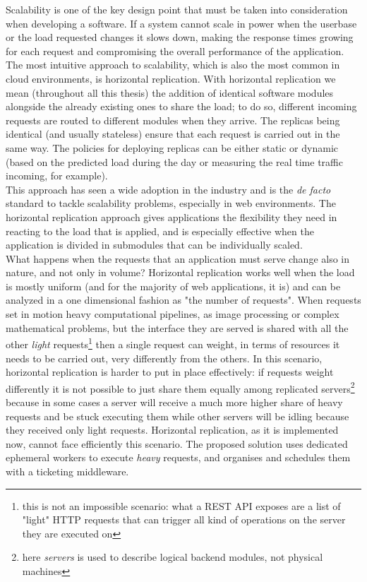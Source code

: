 Scalability is one of the key design point that must be taken into consideration when developing a software. If a system cannot scale in power when the userbase or the load requested changes it slows down, making the response times growing for each request and compromising the overall performance of the application. The most intuitive approach to scalability, which is also the most common in cloud environments, is horizontal replication. With horizontal replication we mean (throughout all this thesis) the addition of identical software modules alongside the already existing ones to share the load; to do so, different incoming requests are routed to different modules when they arrive. The replicas being identical (and usually stateless) ensure that each request is carried out in the same way. The policies for deploying replicas can be either static or dynamic (based on the predicted load during the day or measuring the real time traffic incoming, for example).\\

This approach has seen a wide adoption in the industry and is the \textit{de facto} standard to tackle scalability problems, especially in web environments. The horizontal replication approach gives applications the flexibility they need in reacting to the load that is applied, and is especially effective when the application is divided in submodules that can be individually scaled.\\

What happens when the requests that an application must serve change also in nature, and not only in volume? Horizontal replication works well when the load is mostly uniform (and for the majority of web applications, it is) and can be analyzed in a one dimensional fashion as "the number of requests". When requests set in motion heavy computational pipelines, as image processing or complex mathematical problems, but the interface they are served is shared with all the other \textit{light} requests\footnote{this is not an impossible scenario: what a REST API exposes are a list of "light" HTTP requests that can trigger all kind of operations on the server they are executed on} then a single request can weight, in terms of resources it needs to be carried out, very differently from the others. In this scenario, horizontal replication is harder to put in place effectively: if requests weight differently it is not possible to just share them equally among replicated servers\footnote{here \textit{servers} is used to describe logical backend modules, not physical machines} because in some cases a server will receive a much more higher share of heavy requests and be stuck executing them while other servers will be idling because they received only light requests. Horizontal replication, as it is implemented now, cannot face efficiently this scenario. The proposed solution uses dedicated ephemeral workers to execute \textit{heavy} requests, and organises and schedules them with a ticketing middleware. 
